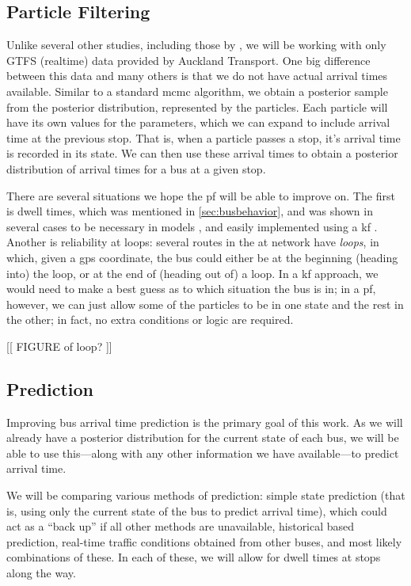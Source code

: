 \documentclass[12pt,a4paper]{article}
\begin{document}
\subsection{Particle Filtering}
\label{sec:new-pf}

Unlike several other studies, including those by \cite{hans-etal:2015},
we will be working with only GTFS (realtime) data provided by Auckland Transport.
One big difference between this data and many others is that we do not have
actual arrival times available.
Similar to a standard \gls{mcmc} algorithm, we obtain a posterior sample from the posterior
distribution, represented by the particles.
Each particle will have its own values for the parameters,
which we can expand to include arrival time at the previous stop.
That is, when a particle passes a stop, it's arrival time is recorded in its state.
We can then use these arrival times to obtain a posterior distribution of arrival times
for a bus at a given stop.


There are several situations we hope the \gls{pf} will be able to improve on.
The first is dwell times, which was mentioned in \cref{sec:busbehavior}, 
and was shown in several cases to be necessary in models \citep{cn}, 
and easily implemented using a \gls{kf} \citep{hans-etal:2015}.
Another is reliability at loops:
several routes in the \gls{at} network have \emph{loops},
in which, given a \gls{gps} coordinate, the bus could either be
at the beginning (heading into) the loop, or at the end of (heading out of) a loop.
In a \gls{kf} approach, we would need to make a best guess as to which situation 
the bus is in; 
in a \gls{pf}, however, we can just allow some of the particles to be in one state
and the rest in the other;
in fact, no extra conditions or logic are required.

[[ FIGURE of loop? ]]




\subsection{Prediction}
\label{sec:new-prediction}


Improving bus arrival time prediction is the primary goal of this work.
As we will already have a posterior distribution for the current state of
each bus, 
we will be able to use this---along with any other information we
have available---to predict arrival time.


We will be comparing various methods of prediction:
simple state prediction (that is, using only the current state of the 
bus to predict arrival time),
which could act as a ``back up'' if all other methods are unavailable,
historical based prediction,
real-time traffic conditions obtained from other buses,
and most likely combinations of these.
In each of these, we will allow for dwell times at stops along the way.
\end{document}
